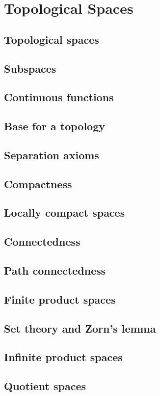 \chapter{Topological Spaces}
\section{Topological spaces}

\section{Subspaces}
\section{Continuous functions}
\section{Base for a topology}
\section{Separation axioms}
\section{Compactness}
\section{Locally compact spaces}
\section{Connectedness}
\section{Path connectedness}
\section{Finite product spaces}
\section{Set theory and Zorn's lemma}
\section{Infinite product spaces}
\section{Quotient spaces}

